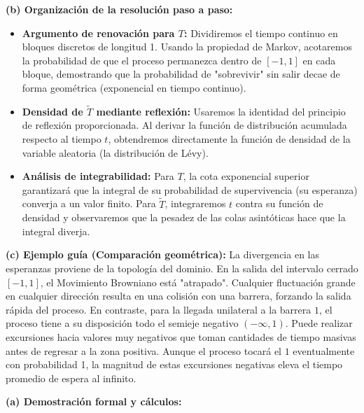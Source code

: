 \documentclass[11pt, letterpaper]{article}
\begin{document}
\begin{solucion}
    \textbf{(b) Organización de la resolución paso a paso:}
    \begin{itemize}
        \item[(i)] \textbf{Argumento de renovación para $T$:} Dividiremos el tiempo continuo en bloques discretos de longitud 1. Usando la propiedad de Markov, acotaremos la probabilidad de que el proceso permanezca dentro de $[-1, 1]$ en cada bloque, demostrando que la probabilidad de "sobrevivir" sin salir decae de forma geométrica (exponencial en tiempo continuo).
        \item[(ii)] \textbf{Densidad de $\tilde{T}$ mediante reflexión:} Usaremos la identidad del principio de reflexión proporcionada. Al derivar la función de distribución acumulada respecto al tiempo $t$, obtendremos directamente la función de densidad de la variable aleatoria (la distribución de Lévy).
        \item[(iii)] \textbf{Análisis de integrabilidad:} Para $T$, la cota exponencial superior garantizará que la integral de su probabilidad de supervivencia (su esperanza) converja a un valor finito. Para $\tilde{T}$, integraremos $t$ contra su función de densidad y observaremos que la pesadez de las colas asintóticas hace que la integral diverja.
    \end{itemize}

    \vspace{3mm}
    \textbf{(c) Ejemplo guía (Comparación geométrica):}
    La divergencia en las esperanzas proviene de la topología del dominio. En la salida del intervalo cerrado $[-1, 1]$, el Movimiento Browniano está "atrapado". Cualquier fluctuación grande en cualquier dirección resulta en una colisión con una barrera, forzando la salida rápida del proceso.
    En contraste, para la llegada unilateral a la barrera $1$, el proceso tiene a su disposición todo el semieje negativo $(-\infty, 1)$. Puede realizar excursiones hacia valores muy negativos que toman cantidades de tiempo masivas antes de regresar a la zona positiva. Aunque el proceso tocará el $1$ eventualmente con probabilidad 1, la magnitud de estas excursiones negativas eleva el tiempo promedio de espera al infinito.

    \vspace{3mm}
    \textbf{(a) Demostración formal y cálculos:}


\end{solucion}
\end{document}
